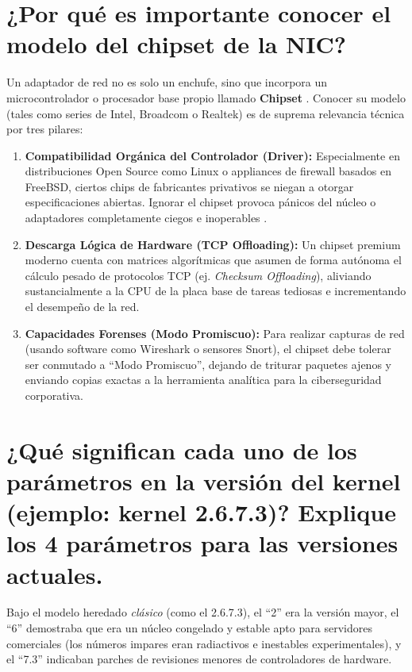 \documentclass[a4paper,12pt]{article}
\begin{document}
\section{¿Por qué es importante conocer el modelo del chipset de la NIC?}

Un adaptador de red no es solo un enchufe, sino que incorpora un microcontrolador o procesador base propio llamado \textbf{Chipset} \cite{ref5}. Conocer su modelo (tales como series de Intel, Broadcom o Realtek) es de suprema relevancia técnica por tres pilares:

\begin{enumerate}
    \item \textbf{Compatibilidad Orgánica del Controlador (Driver):} Especialmente en distribuciones Open Source como Linux o appliances de firewall basados en FreeBSD, ciertos chips de fabricantes privativos se niegan a otorgar especificaciones abiertas. Ignorar el chipset provoca pánicos del núcleo o adaptadores completamente ciegos e inoperables \cite{ref5}.
    \item \textbf{Descarga Lógica de Hardware (TCP Offloading):} Un chipset premium moderno cuenta con matrices algorítmicas que asumen de forma autónoma el cálculo pesado de protocolos TCP (ej. \textit{Checksum Offloading}), aliviando sustancialmente a la CPU de la placa base de tareas tediosas e incrementando el desempeño de la red.
    \item \textbf{Capacidades Forenses (Modo Promiscuo):} Para realizar capturas de red (usando software como Wireshark o sensores Snort), el chipset debe tolerar ser conmutado a ``Modo Promiscuo'', dejando de triturar paquetes ajenos y enviando copias exactas a la herramienta analítica para la ciberseguridad corporativa.
\end{enumerate}

\section{¿Qué significan cada uno de los parámetros en la versión del kernel (ejemplo: kernel 2.6.7.3)? Explique los 4 parámetros para las versiones actuales.}

Bajo el modelo heredado \textit{clásico} (como el 2.6.7.3), el ``2'' era la versión mayor, el ``6'' demostraba que era un núcleo congelado y estable apto para servidores comerciales (los números impares eran radiactivos e inestables experimentales), y el ``7.3'' indicaban parches de revisiones menores de controladores de hardware. 
\end{document}
